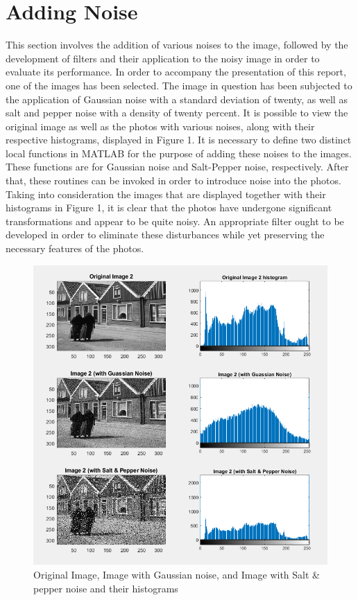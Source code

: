 \section{Adding Noise}\label{P1}

This section involves the addition of various noises to the image, 
followed by the development of filters and their application to the noisy image 
in order to evaluate its performance. In order to accompany the presentation of this report, 
one of the images has been selected. 
The image in question has been subjected to the application of Gaussian noise with 
a standard deviation of twenty, as well as salt and pepper noise with a density of twenty percent. 
It is possible to view the original image as well as the photos with various noises, along with 
their respective histograms, displayed in Figure 1. 
It is necessary to define two distinct local functions in MATLAB for the purpose of adding 
these noises to the images. These functions are for Gaussian noise and Salt-Pepper noise, 
respectively. After that, these routines can be invoked in order to introduce noise 
into the photos.
Taking into consideration the images that are displayed together with their histograms 
in Figure 1, it is clear that the photos have undergone significant transformations and 
appear to be quite noisy. An appropriate filter ought to be developed in order to eliminate 
these disturbances while yet preserving the necessary features of the photos.

\begin{figure} [ht]
    \centering
    \includegraphics[width = \textwidth]{Resources/Images_Org_Nosied.png}
    \caption{Original Image, Image with Gaussian noise, and Image with Salt \& pepper noise and their histograms}
    \label{fig:AddingNoise}
\end{figure}